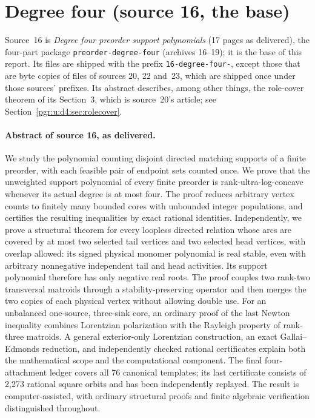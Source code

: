\documentclass[11pt]{article}
\numberwithin{equation}{section}
\theoremstyle{definition}\newtheorem{definition}[theorem]{Definition}\newtheorem{remark}[theorem]{Remark}
\begin{document}
\section{Degree four (source 16, the base)}\label{pgr:u:d4:sec}

Source~16 is \emph{Degree four preorder support polynomials} (17 pages as
delivered), the four-part package \texttt{preorder-degree-four} (archives
16--19); it is the base of this report. Its files are shipped with the
prefix \texttt{16-degree-four-}, except those that are byte copies of
files of sources 20, 22 and~23, which are shipped once under those
sources' prefixes. Its abstract describes, among other things, the role-cover
theorem of its Section~3, which is source~20's article; see
Section~\ref{pgr:u:d4:sec:rolecover}.

\paragraph{Abstract of source 16, as delivered.}

We study the polynomial counting disjoint directed matching supports of a finite preorder, with each feasible pair of endpoint sets counted once. We prove that the unweighted support polynomial of every finite preorder is rank-ultra-log-concave whenever its actual degree is at most four. The proof reduces arbitrary vertex counts to finitely many bounded cores with unbounded integer populations, and certifies the resulting inequalities by exact rational identities. Independently, we prove a structural theorem for every loopless directed relation whose arcs are covered by at most two selected tail vertices and two selected head vertices, with overlap allowed: its signed physical monomer polynomial is real stable, even with arbitrary nonnegative independent tail and head activities. Its support polynomial therefore has only negative real roots. The proof couples two rank-two transversal matroids through a stability-preserving operator and then merges the two copies of each physical vertex without allowing double use. For an unbalanced one-source, three-sink core, an ordinary proof of the last Newton inequality combines Lorentzian polarization with the Rayleigh property of rank-three matroids. A general exterior-only Lorentzian construction, an exact Gallai--Edmonds reduction, and independently checked rational certificates explain both the mathematical scope and the computational component. The final four-attachment ledger covers all 76 canonical templates; its last certificate consists of 2,273 rational square orbits and has been independently replayed. The result is computer-assisted, with ordinary structural proofs and finite algebraic verification distinguished throughout.
\end{document}
